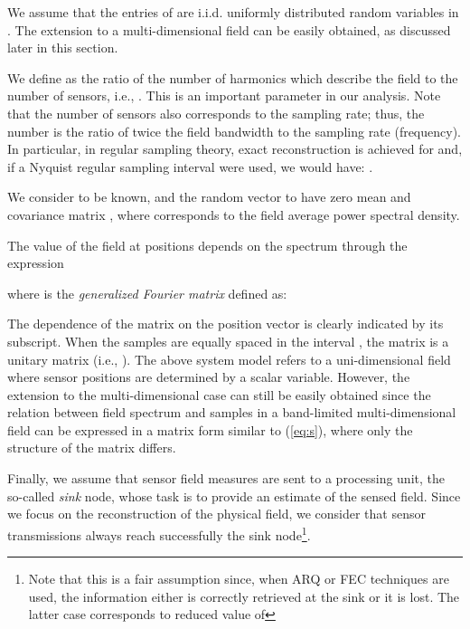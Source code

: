 \documentclass[final, a4paper]{IEEEtran}
\begin{document}
We assume that the entries of  are
i.i.d. uniformly distributed random variables in . The
extension to a multi-dimensional field can be easily obtained, as
discussed later in this section.

We define  as the ratio of the number of harmonics
which describe the field to the number of sensors, i.e., . This is an
important parameter in our analysis.
Note that the number of sensors  also corresponds to the sampling rate;
thus, the number  is the ratio of twice the field bandwidth
to the sampling rate (frequency).
In particular, in regular sampling theory, exact reconstruction is achieved for  and,
if a Nyquist regular sampling interval were used, we would have: .

We consider  to be known, and the random vector  to have zero mean and covariance matrix
, where  corresponds to the field
average power spectral density.

The value  of the field at positions  depends on the spectrum 
through the expression

where  is the 
{\em generalized Fourier matrix} defined as:

The dependence of the matrix  on the position vector 
is clearly indicated by its subscript.
When the samples are equally spaced in the interval ,
the matrix  is a unitary matrix
(i.e., ).
The above system model refers to a uni-dimensional
field where sensor positions are determined by a scalar variable.
However, the extension to the multi-dimensional case can still be
easily obtained since the relation between field spectrum and
samples in a band-limited multi-dimensional field can be expressed
in a matrix form similar to (\ref{eq:s}), where only the structure
of the matrix  differs.

Finally, we assume that sensor field measures are sent to a processing unit,
the so-called {\em sink} node, whose task is to provide an estimate
of the sensed field.
Since we focus on the reconstruction of the physical field,
we consider that sensor transmissions always reach successfully the sink node\footnote{Note that this is a fair assumption since, when ARQ or FEC techniques are used, the information either
is correctly retrieved at the sink or it is lost. The latter case corresponds to reduced value of 
}.
\end{document}

